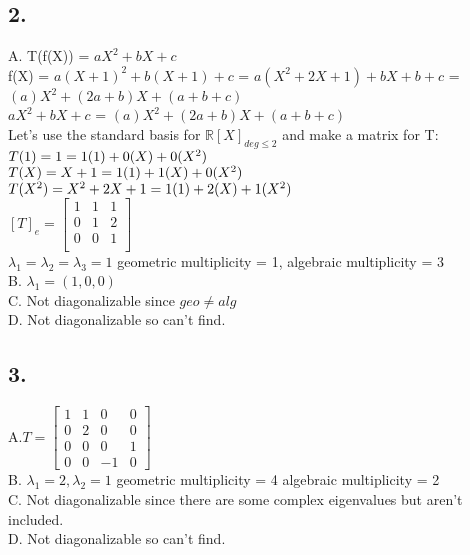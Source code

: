 \documentclass{article}
\newcommand{\R}[0]{\mathbb{R}}
\begin{document}
\subsection*{2.}
A. T(f(X)) = $aX^2 + bX + c$
\\f(X) = $a(X + 1)^2 + b(X + 1) + c$ = $a(X^2 + 2X + 1) + bX + b + c$ = $(a)X^2 + (2a + b)X + (a + b + c)$
\\$aX^2 + bX + c$ = $(a)X^2 + (2a + b)X + (a + b + c)$
\\Let's use the standard basis for $\R[X]_{deg \leq 2}$ and make a matrix for T:
\\$T(1) = 1
\\ = 1(1) + 0(X) + 0(X^2)$ 
\\$T(X) = X + 1
\\ = 1(1) + 1(X) + 0(X^2)$
\\$T(X^2) = X^2 + 2X + 1
\\ = 1(1) + 2(X) + 1(X^2)$
\\[10px]
$[T]_e = \begin{bmatrix}
1 & 1 & 1 \\
0 & 1 & 2 \\
0 & 0 & 1\\
\end{bmatrix}$
\\$\lambda_1 = \lambda_2 = \lambda_3 = 1$ geometric multiplicity = 1, algebraic multiplicity  = 3
\\B. $\lambda_1 = (1, 0, 0)$
\\C. Not diagonalizable since $geo \neq alg$
\\D. Not diagonalizable so can't find.
\subsection*{3.}
A.$T = \begin{bmatrix}
1 & 1 & 0 & 0\\
0 & 2 & 0 & 0\\
0 & 0 & 0 & 1\\
0 & 0 & -1 & 0
\end{bmatrix}$
\\B. $\lambda_1 = 2, \lambda_2 = 1$ geometric multiplicity = 4 algebraic multiplicity = 2
\\C. Not diagonalizable since there are some complex eigenvalues but aren't included.
\\D. Not diagonalizable so can't find.
\end{document}
